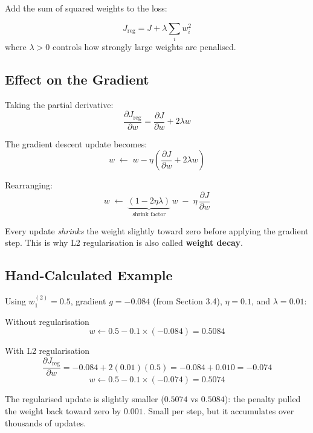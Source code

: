 \documentclass[12pt, a4paper]{article}
\newif\ifstudentmode
\newcommand{\sol}[2][6cm]{%
  \ifstudentmode\underline{\hspace{#1}}\else{#2}\fi}
\theoremstyle{definition}
\begin{document}
Add the sum of squared weights to the loss:

\begin{resultbox}
\[
  J_{\text{reg}} = J + \lambda \sum_i w_i^2
\]
where $\lambda > 0$ controls how strongly large weights are penalised.
\end{resultbox}

\subsection{Effect on the Gradient}

Taking the partial derivative:
\[
  \frac{\partial J_{\text{reg}}}{\partial w}
  = \frac{\partial J}{\partial w} + \sol[3cm]{2\lambda w}
\]

The gradient descent update becomes:
\[
  w \;\longleftarrow\; w - \eta\!\left(\frac{\partial J}{\partial w} + 2\lambda w\right)
\]

Rearranging:
\[
  w \;\longleftarrow\; \underbrace{(1 - 2\eta\lambda)}_{\text{shrink factor}}\, w
                    \;-\; \eta\,\frac{\partial J}{\partial w}
\]

Every update \emph{shrinks} the weight slightly toward zero before applying
the gradient step.  This is why L2 regularisation is also called
\textbf{weight decay}.

\subsection{Hand-Calculated Example}

Using $w^{(2)}_1 = 0.5$, gradient $g = -0.084$ (from Section 3.4),
$\eta = 0.1$, and $\lambda = 0.01$:

\begin{stepbox}{Without regularisation}
\[
  w \leftarrow 0.5 - 0.1 \times (-0.084) = \sol[4cm]{0.5084}
\]
\end{stepbox}

\vspace{0.6em}

\begin{stepbox}{With L2 regularisation}
\[
  \frac{\partial J_{\text{reg}}}{\partial w}
  = -0.084 + 2(0.01)(0.5) = -0.084 + 0.010 = \sol[3cm]{-0.074}
\]
\[
  w \leftarrow 0.5 - 0.1 \times (-0.074) = \sol[4cm]{0.5074}
\]
\end{stepbox}

\vspace{0.4em}

The regularised update is slightly smaller ($0.5074$ vs $0.5084$): the
penalty pulled the weight back toward zero by $0.001$.  Small per step, but
it accumulates over thousands of updates.
\end{document}
